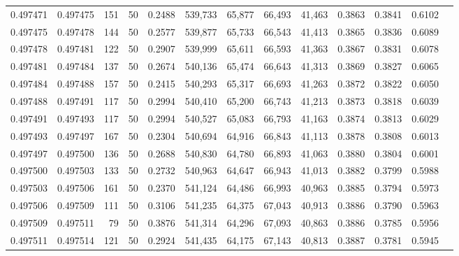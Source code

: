 \begin{tabular}{rrrrrrrrrrrrr}
0.497471 & 0.497475 &   151 &  50 &                                     0.2488 & 539,733 &  65,877 &  66,493 &  41,463 & 0.3863 & 0.3841 & 0.6102 \\
0.497475 & 0.497478 &   144 &  50 &                                     0.2577 & 539,877 &  65,733 &  66,543 &  41,413 & 0.3865 & 0.3836 & 0.6089 \\
0.497478 & 0.497481 &   122 &  50 &                                     0.2907 & 539,999 &  65,611 &  66,593 &  41,363 & 0.3867 & 0.3831 & 0.6078 \\
0.497481 & 0.497484 &   137 &  50 &                                     0.2674 & 540,136 &  65,474 &  66,643 &  41,313 & 0.3869 & 0.3827 & 0.6065 \\
0.497484 & 0.497488 &   157 &  50 &                                     0.2415 & 540,293 &  65,317 &  66,693 &  41,263 & 0.3872 & 0.3822 & 0.6050 \\
0.497488 & 0.497491 &   117 &  50 &                                     0.2994 & 540,410 &  65,200 &  66,743 &  41,213 & 0.3873 & 0.3818 & 0.6039 \\
0.497491 & 0.497493 &   117 &  50 &                                     0.2994 & 540,527 &  65,083 &  66,793 &  41,163 & 0.3874 & 0.3813 & 0.6029 \\
0.497493 & 0.497497 &   167 &  50 &                                     0.2304 & 540,694 &  64,916 &  66,843 &  41,113 & 0.3878 & 0.3808 & 0.6013 \\
0.497497 & 0.497500 &   136 &  50 &                                     0.2688 & 540,830 &  64,780 &  66,893 &  41,063 & 0.3880 & 0.3804 & 0.6001 \\
0.497500 & 0.497503 &   133 &  50 &                                     0.2732 & 540,963 &  64,647 &  66,943 &  41,013 & 0.3882 & 0.3799 & 0.5988 \\
0.497503 & 0.497506 &   161 &  50 &                                     0.2370 & 541,124 &  64,486 &  66,993 &  40,963 & 0.3885 & 0.3794 & 0.5973 \\
0.497506 & 0.497509 &   111 &  50 &                                     0.3106 & 541,235 &  64,375 &  67,043 &  40,913 & 0.3886 & 0.3790 & 0.5963 \\
0.497509 & 0.497511 &    79 &  50 &                                     0.3876 & 541,314 &  64,296 &  67,093 &  40,863 & 0.3886 & 0.3785 & 0.5956 \\
0.497511 & 0.497514 &   121 &  50 &                                     0.2924 & 541,435 &  64,175 &  67,143 &  40,813 & 0.3887 & 0.3781 & 0.5945 \\

\end{tabular}
